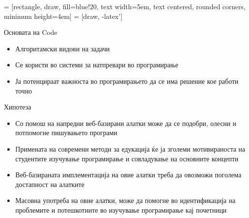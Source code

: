  = [rectangle, draw, fill=blue!20,
text width=5em, text centered, rounded corners, minimum height=4em]
 = [draw, -latex']

\begin{frame}[fragile]{Основата на Code}
    \begin{itemize}
      \item Алгоритамски видови на задачи
    \end{itemize}
\begin{center}
\end{center}
\pause
\begin{itemize}[<+->]
  \item Се користи во системи за натпревари во програмирање
  \item Ја потенцираат важноста во програмирањето да се има решение
  кое работи точно
\end{itemize}
\end{frame}


\begin{frame}{Хипотеза}
    \begin{itemize}
      \item Со помош на напредни веб-базирани алатки може да се подобри, олесни
      и потпомогне пишувањето програми
      \item Примената на современи методи за едукација ќе ја зголеми
      мотивираноста на студентите изучување програмирање и совладување
      на основните концепти
      \item Веб-базираната имплементација на овие алатки треба да овозможи
      поголема достапност на алатките
      \item Масовна употреба на овие алатки, може да помогне во идентификација
      на проблемите и потешкотиите во изучување програмирање кај почетници
    \end{itemize}
\end{frame}

